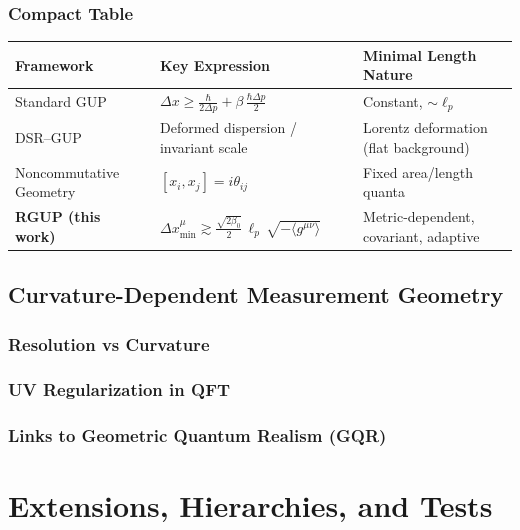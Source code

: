 \documentclass[11pt,oneside]{book}
\numberwithin{equation}{chapter}
\newcommand{\lp}{\ell_p}             %
\newcommand{\betaz}{\beta_0}
\begin{document}
\section{Compact Table}
\begingroup
\small
\renewcommand{\arraystretch}{1.18}
\begin{center}
\begin{tabular}{|p{3.1cm}|p{6.0cm}|p{4.1cm}|}
\hline
\textbf{Framework} & \textbf{Key Expression} & \textbf{Minimal Length Nature} \\
\hline
Standard GUP & $\Delta x \ge \frac{\hbar}{2\Delta p} + \beta\,\frac{\hbar\Delta p}{2}$ & Constant, $\sim \lp$ \\
\hline
DSR--GUP & Deformed dispersion / invariant scale & Lorentz deformation (flat background) \\
\hline
Noncommutative Geometry & $[x_i,x_j]=i\theta_{ij}$ & Fixed area/length quanta \\
\hline
\textbf{RGUP (this work)} & $\Delta x_{\min}^{\mu}\gtrsim \frac{\sqrt{2\betaz}}{2}\,\lp\,\sqrt{-\langle g^{\mu\nu}\rangle}$ & Metric-dependent, covariant, adaptive \\
\hline
\end{tabular}
\end{center}
\endgroup

\chapter{Curvature-Dependent Measurement Geometry}
\section{Resolution vs Curvature}
\section{UV Regularization in QFT}
\section{Links to Geometric Quantum Realism (GQR)}

\part{Extensions, Hierarchies, and Tests}
\end{document}
